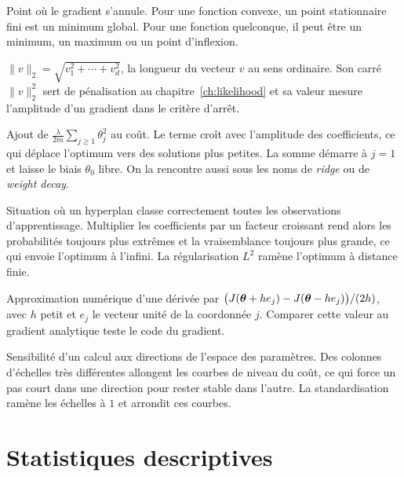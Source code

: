 \begin{description}[style=nextline,leftmargin=0pt]
  \item[\dsym{stationnaire}{Point stationnaire}]
  Point où le gradient s'annule. Pour une fonction convexe, un point stationnaire
  fini est un minimum global. Pour une fonction quelconque, il peut être un
  minimum, un maximum ou un point d'inflexion.

  \item[\dsym{norme}{Norme euclidienne}]
  $\|v\|_2=\sqrt{v_1^2+\cdots+v_d^2}$, la longueur du vecteur $v$ au sens
  ordinaire. Son carré $\|v\|_2^2$ sert de pénalisation au
  chapitre~\ref{ch:likelihood} et sa valeur mesure l'amplitude d'un gradient dans
  le critère d'arrêt.

  \item[\dsym{regularisation}{Régularisation $L^2$}]
  Ajout de $\frac{\lambda}{2m}\sum_{j\geq1}\theta_j^2$ au coût. Le terme croît
  avec l'amplitude des coefficients, ce qui déplace l'optimum vers des solutions
  plus petites. La somme démarre à $j=1$ et laisse le biais $\theta_0$ libre. On
  la rencontre aussi sous les noms de \emph{ridge} ou de \emph{weight decay}.

  \item[\dsym{separation}{Séparation complète}]
  Situation où un hyperplan classe correctement toutes les observations
  d'apprentissage. Multiplier les coefficients par un facteur croissant rend alors
  les probabilités toujours plus extrêmes et la vraisemblance toujours plus
  grande, ce qui envoie l'optimum à l'infini. La régularisation $L^2$ ramène
  l'optimum à distance finie.

  \item[\dsym{diffinie}{Différence finie centrée}]
  Approximation numérique d'une dérivée par
  $\big(J(\boldsymbol{\theta}+he_j)-J(\boldsymbol{\theta}-he_j)\big)/(2h)$, avec $h$ petit et $e_j$ le vecteur
  unité de la coordonnée $j$. Comparer cette valeur au gradient analytique teste
  le code du gradient.

  \item[\dsym{conditionnement}{Conditionnement}]
  Sensibilité d'un calcul aux directions de l'espace des paramètres. Des colonnes
  d'échelles très différentes allongent les courbes de niveau du coût, ce qui
  force un pas court dans une direction pour rester stable dans l'autre. La
  standardisation ramène les échelles à $1$ et arrondit ces courbes.
\end{description}

\section{Statistiques descriptives}
\label{sec:stats-desc}

